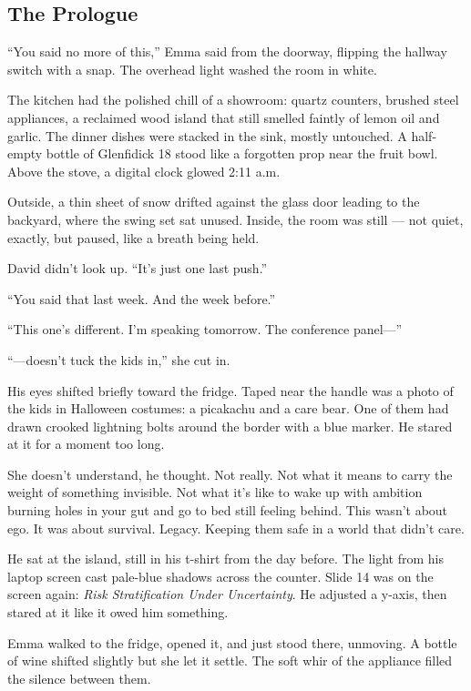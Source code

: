 \subsection{The Prologue}

“You said no more of this,” Emma said from the doorway, flipping the hallway switch with a snap. The overhead light 
washed the room in white.

The kitchen had the polished chill of a showroom: quartz counters, brushed steel appliances, a reclaimed wood island 
that still smelled faintly of lemon oil and garlic. The dinner dishes were stacked in the sink, mostly untouched. 
A half-empty bottle of Glenfidick 18 stood like a forgotten prop near the fruit bowl. Above the stove, a digital clock 
glowed 2:11 a.m.

Outside, a thin sheet of snow drifted against the glass door leading to the backyard, where the swing set sat unused. 
Inside, the room was still — not quiet, exactly, but paused, like a breath being held.

David didn’t look up. “It’s just one last push.”

“You said that last week. And the week before.”

“This one’s different. I’m speaking tomorrow. The conference panel—”

“—doesn’t tuck the kids in,” she cut in.

His eyes shifted briefly toward the fridge. Taped near the handle was a photo of the kids in Halloween costumes: a picakachu 
and a care bear. One of them had drawn crooked lightning bolts around the border with a blue marker. He stared at it for a 
moment too long.

She doesn’t understand, he thought. Not really. Not what it means to carry the weight of something invisible. Not what it’s 
like to wake up with ambition burning holes in your gut and go to bed still feeling behind. This wasn’t about ego. It was 
about survival. Legacy. Keeping them safe in a world that didn’t care.

He sat at the island, still in his t-shirt from the day before. The light from his laptop screen cast pale-blue shadows 
across the counter. Slide 14 was on the screen again: \textit{Risk Stratification Under Uncertainty}. He adjusted a 
y-axis, then stared at it like it owed him something.

Emma walked to the fridge, opened it, and just stood there, unmoving. A bottle of wine shifted slightly but she let it 
settle. The soft whir of the appliance filled the silence between them.

